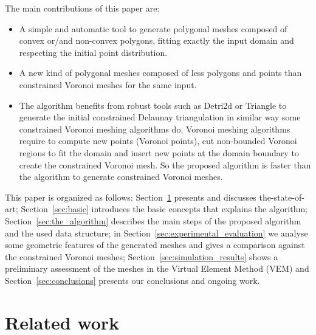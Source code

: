 \documentclass[lineno,pdflatex,sn-mathphys]{sn-jnl}%
\theoremstyle{thmstyleone}%
\theoremstyle{thmstyletwo}%
\theoremstyle{thmstylethree}%
\begin{document}
The main contributions of this paper are:
\begin{itemize}
    \item A simple and automatic tool to generate polygonal meshes composed of convex or/and non-convex polygons, fitting exactly the input domain and respecting the initial point distribution. 
    \item A new kind of polygonal meshes composed of less polygons and points than constrained Voronoi  meshes for the same input.
    \item The algorithm benefits from robust tools such as Detri2d or Triangle to generate the initial constrained Delaunay triangulation  in similar way some constrained Voronoi meshing algorithms do.  Voronoi meshing algorithms require to compute new points (Voronoi points),  cut non-bounded  Voronoi regions to fit the domain  and  insert new points at the domain boundary  to create the constrained Voronoi mesh. So the proposed algorithm is faster than the algorithm to generate constrained Voronoi meshes.
    
\end{itemize}
\noindent
This paper is organized as follows: Section~\ref{sec:relatedwork} presents and discusses the-state-of-art;  Section~\ref{sec:basic} introduces the basic concepts  that explains the algorithm;  Section~\ref{sec:the_algorithm} describes the main steps of the proposed algorithm  and the used data structure; in Section~\ref{sec:experimental_evaluation} we analyse some geometric features of the generated meshes and gives a comparison against the constrained  Voronoi meshes; Section~\ref{sec:simulation_results} shows a preliminary assessment of the meshes in the Virtual Element Method (VEM) and Section~\ref{sec:conclusions} presents our  conclusions and ongoing work.

\section{Related work}
\label{sec:relatedwork}

\end{document}
